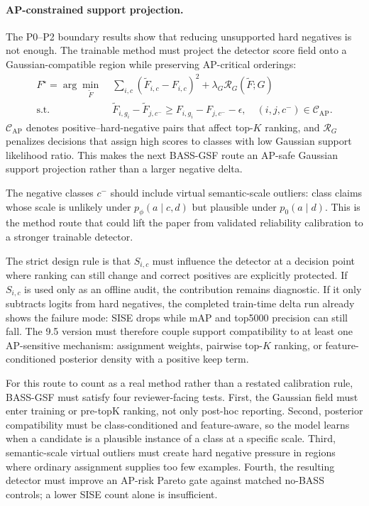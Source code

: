 \documentclass[10pt]{article}
\begin{document}
\paragraph{AP-constrained support projection.}
The P0--P2 boundary results show that reducing unsupported hard negatives is
not enough.  The trainable method must project the detector score field onto a
Gaussian-compatible region while preserving AP-critical orderings:
\begin{equation}
\begin{aligned}
  F^\star = \arg\min_{\widetilde{F}}\;
  &\sum_{i,c}(\widetilde{F}_{i,c}-F_{i,c})^2
  + \lambda_G \mathcal{R}_G(\widetilde{F};G)\\
  \mathrm{s.t.}\quad
  &\widetilde{F}_{i,g_i}-\widetilde{F}_{j,c^-}
  \ge
  F_{i,g_i}-F_{j,c^-}-\epsilon,
  \quad (i,j,c^-)\in\mathcal{C}_{\mathrm{AP}} .
\end{aligned}
\end{equation}
$\mathcal{C}_{\mathrm{AP}}$ denotes positive--hard-negative pairs that affect
top-$K$ ranking, and $\mathcal{R}_G$ penalizes decisions that assign high
scores to classes with low Gaussian support likelihood ratio.  This makes the
next BASS-GSF route an AP-safe Gaussian support projection rather than a larger
negative delta.

The negative classes $c^-$ should include virtual semantic-scale outliers:
class claims whose scale is unlikely under $p_\phi(a\mid c,d)$ but plausible
under $p_0(a\mid d)$.  This is the method route that could lift the paper from
validated reliability calibration to a stronger trainable detector.

The strict design rule is that $S_{i,c}$ must influence the detector at a
decision point where ranking can still change and correct positives are
explicitly protected.  If $S_{i,c}$ is used only as an offline audit, the
contribution remains diagnostic.  If it only subtracts logits from hard
negatives, the completed train-time delta run already shows the failure mode:
SISE drops while mAP and top5000 precision can still fall.  The 9.5 version
must therefore couple support compatibility to at least one AP-sensitive
mechanism: assignment weights, pairwise top-$K$ ranking, or feature-conditioned
posterior density with a positive keep term.

For this route to count as a real method rather than a restated calibration
rule, BASS-GSF must satisfy four reviewer-facing tests.  First, the Gaussian
field must enter training or pre-topK ranking, not only post-hoc reporting.
Second, posterior compatibility must be class-conditioned and feature-aware, so
the model learns when a candidate is a plausible instance of a class at a
specific scale.  Third, semantic-scale virtual outliers must create hard
negative pressure in regions where ordinary assignment supplies too few
examples.  Fourth, the resulting detector must improve an AP-risk Pareto gate
against matched no-BASS controls; a lower SISE count alone is insufficient.
\end{document}
